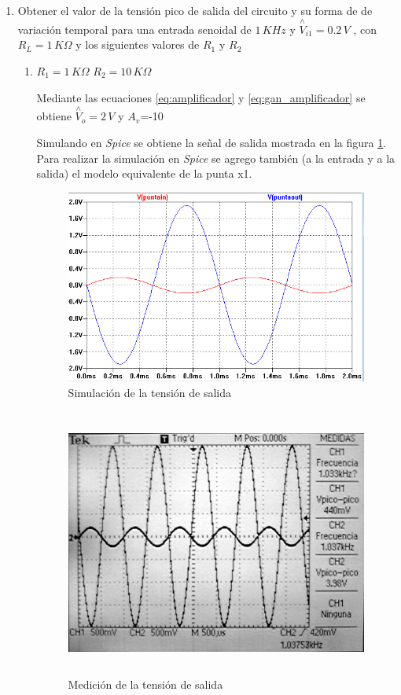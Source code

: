 \documentclass[10pt,spanish,a4paper,openany,notitlepage]{article}
\begin{document}
\begin{enumerate}
\item Obtener el valor de la tensión pico de salida del circuito y su forma de 
de variación temporal para una entrada senoidal de $1\,\unit{KHz}$ y $\overset{\wedge}{V}_{i1} = 0.2\,\unit{V}$
, con $R_L = 1\,\unit{K\Omega}$ y los siguientes valores de $R_1$ y $R_2$

\begin{enumerate}
    \item $R_1 = 1\,\unit{K\Omega}$ $R_2 = 10\,\unit{K\Omega}$
    
    Mediante las ecuaciones \ref{eq:amplificador} y \ref{eq:gan_amplificador}  se obtiene $\overset{\wedge}{V}_o = 2\,\unit{V}$ y $A_v$=-10
    
    Simulando en \emph{Spice} se obtiene la señal de salida mostrada en la
    figura \ref{fig:vo_1a}. Para realizar la simulación en  \emph{Spice} se agrego
    también (a la entrada y a la salida) el modelo equivalente de la punta x1.
    
    \begin{figure}[H]
    \centering
    \includegraphics[scale=0.8]{simulaciones/A1A.png}
    \caption{Simulación de la tensión de salida}
    \label{fig:vo_1a}
    \end{figure}
    
    \begin{figure}[H]
    \centering
    \includegraphics[width=350pt, height=250pt]{mediciones/A1a.jpg}
    \caption{Medición de la tensión de salida}
    \label{fig:vo_med_1a}
    \end{figure}
    

\end{enumerate}
\end{enumerate}
\end{document}

